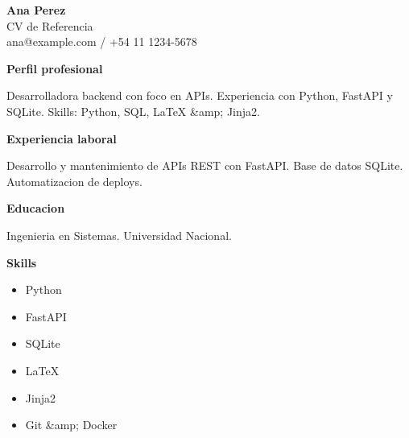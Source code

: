 \documentclass[10pt,a4paper]{article}
\begin{document}
\begin{center}
{\Huge \textbf{Ana Perez}}\\[0.25em]
{\color{techblue}\large CV de Referencia}\\[0.5em]
{\small\color{techgray} ana@example.com / +54 11 1234-5678}
\end{center}

\vspace{0.8em}

\noindent\colorbox{techblue}{\parbox{\dimexpr\textwidth-2\fboxsep\relax}{\color{white}\textbf{Perfil profesional}}}
\vspace{0.45em}

Desarrolladora backend con foco en APIs. Experiencia con Python, FastAPI y SQLite. Skills: Python, SQL, LaTeX \&amp; Jinja2.

\vspace{0.8em}
\noindent\colorbox{techblue}{\parbox{\dimexpr\textwidth-2\fboxsep\relax}{\color{white}\textbf{Experiencia laboral}}}
\vspace{0.45em}

Desarrollo y mantenimiento de APIs REST con FastAPI. Base de datos SQLite. Automatizacion de deploys.

\vspace{0.8em}
\noindent\colorbox{techblue}{\parbox{\dimexpr\textwidth-2\fboxsep\relax}{\color{white}\textbf{Educacion}}}
\vspace{0.45em}

Ingenieria en Sistemas. Universidad Nacional.

\vspace{0.8em}
\noindent\colorbox{techblue}{\parbox{\dimexpr\textwidth-2\fboxsep\relax}{\color{white}\textbf{Skills}}}
\vspace{0.45em}

\begin{itemize}
  \item Python
  \item FastAPI
  \item SQLite
  \item LaTeX
  \item Jinja2
  \item Git \&amp; Docker
\end{itemize}

\vspace{0.8em}
\end{document}
